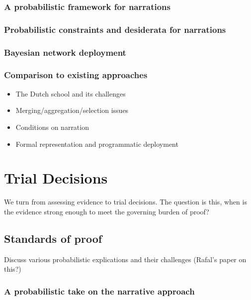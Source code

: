 \documentclass[]{book}
\begin{document}
\section{A probabilistic framework for narrations}

\section{Probabilistic constraints and desiderata for narrations}

\section{Bayesian network deployment}

\section{Comparison to existing approaches}


\begin{itemize}
\item
  The Dutch school and its challenges
\item
  Merging/aggregation/selection issues
\item
  Conditions on narration
\item
  Formal representation and programmatic deployment
\end{itemize}

\part{Trial Decisions}

We turn from assessing
evidence to trial decisions.
The question is this, when is the evidence strong
enough to meet the governing burden of proof?

\chapter{Standards of proof}

Discuss various probabilistic explications and their challenges (Rafal's paper on this?)

\section{A probabilistic take on the narrative approach}
\end{document}

